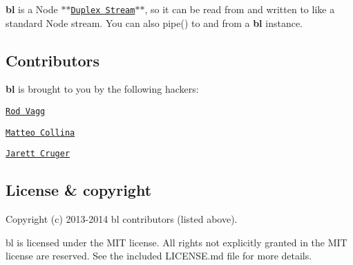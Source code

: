 {\bfseries bl} is a Node $\ast$$\ast$\href{http://nodejs.org/docs/latest/api/stream.html#stream_class_stream_duplex}{\tt Duplex Stream}$\ast$$\ast$, so it can be read from and written to like a standard Node stream. You can also {\ttfamily pipe()} to and from a {\bfseries bl} instance. 



\subsection*{Contributors}

{\bfseries bl} is brought to you by the following hackers\+:


\begin{DoxyItemize}
\item \href{https://github.com/rvagg}{\tt Rod Vagg}
\item \href{https://github.com/mcollina}{\tt Matteo Collina}
\item \href{https://github.com/jcrugzz}{\tt Jarett Cruger} 


\end{DoxyItemize}

\label{_license}%
 \subsection*{License \& copyright}

Copyright (c) 2013-\/2014 bl contributors (listed above).

bl is licensed under the M\+I\+T license. All rights not explicitly granted in the M\+I\+T license are reserved. See the included L\+I\+C\+E\+N\+S\+E.\+md file for more details. 